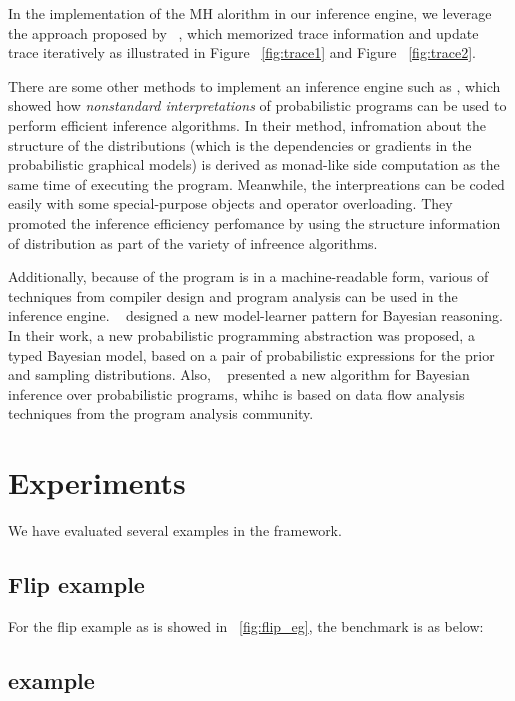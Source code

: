 In the implementation of the MH alorithm in our inference engine, we leverage the approach proposed by ~\cite{lightweight}, which memorized trace information and update trace iteratively as illustrated in Figure ~\ref{fig:trace1} and Figure ~\ref{fig:trace2}. 

There are some other methods to implement an inference engine such as \cite{nonstandard}, which showed how \textit{nonstandard interpretations} of probabilistic programs can be used to perform efficient inference algorithms. In their method, infromation about the structure of the distributions (which is the dependencies or gradients in the probabilistic graphical models) is derived as monad-like side computation as the same time of executing the program. Meanwhile, the interpreations can be coded easily with some special-purpose objects and operator overloading. They promoted the inference efficiency perfomance by using the structure information of distribution as part of the variety of infreence algorithms.

Additionally, because of the program is in a machine-readable form, various of techniques from compiler design and program analysis can be used in the inference engine. ~\cite{gordon2013} designed a new model-learner pattern for Bayesian reasoning. In their work, a new probabilistic programming abstraction was proposed, a typed Bayesian model, based on a pair of probabilistic expressions for the prior and sampling distributions. Also, ~\cite{dataflow} presented a new algorithm for Bayesian inference over probabilistic programs, whihc is based on data flow analysis techniques from the program analysis community.


\section{Experiments}
We have evaluated several examples in the framework. 
\subsection{Flip example}
For the flip example as is showed in ~\ref{fig:flip_eg}, the benchmark is as below:

\subsection{example}